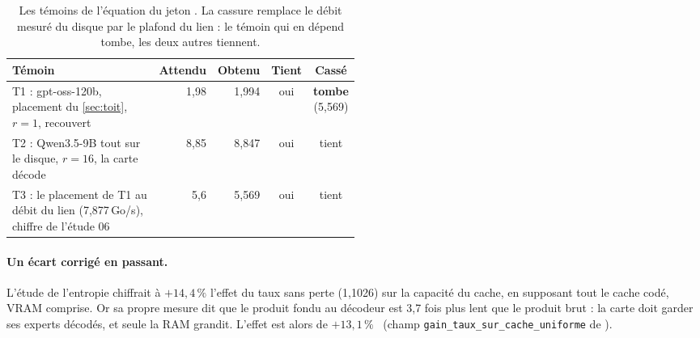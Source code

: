\begin{table}[ht]
\centering\small
\caption[Les témoins de l'équation du jeton]{Les témoins de l'équation du jeton \calc. La cassure remplace le débit mesuré du disque par le plafond du lien : le témoin qui en dépend tombe, les deux autres tiennent.}
\label{tab:temoins-equation}
\begin{tabular}{@{}p{0.5\linewidth}rrcc@{}}
\toprule
Témoin & Attendu & Obtenu & Tient & Cassé \\
\midrule
T1 : gpt-oss-120b, placement du \cref{sec:toit}, $r = 1$, recouvert & 1,98 & 1,994 & oui & \textbf{tombe} (5,569) \\
T2 : Qwen3.5-9B tout sur le disque, $r = 16$, la carte décode & 8,85 & 8,847 & oui & tient \\
T3 : le placement de T1 au débit du lien (7,877\,Go/s), chiffre de l'étude 06 & 5,6 & 5,569 & oui & tient \\
\bottomrule
\end{tabular}
\end{table}

\paragraph{Un écart corrigé en passant.} L'étude de l'entropie chiffrait à $+14{,}4\,\%$ l'effet du taux sans perte (1,1026) sur la capacité du cache, en supposant tout le cache codé, VRAM comprise. Or sa propre mesure dit que le produit fondu au décodeur est 3,7 fois plus lent que le produit brut : la carte doit garder ses experts décodés, et seule la RAM grandit. L'effet est alors de $+13{,}1\,\%$ \calc~(champ \texttt{gain\_taux\_sur\_cache\_uniforme} de ).

